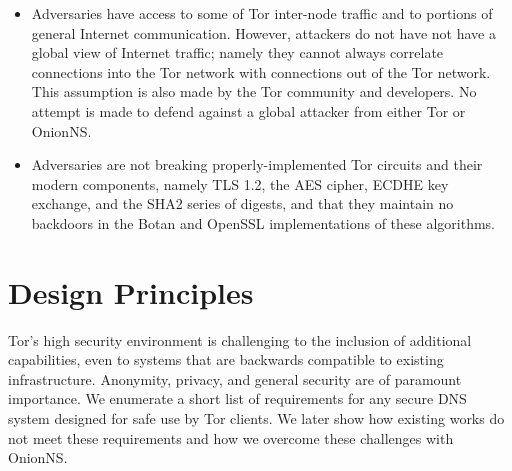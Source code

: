 \begin{itemize}
  \item Adversaries have access to some of Tor inter-node traffic and to portions of general Internet communication. However, attackers do not have not have a global view of Internet traffic; namely they cannot always correlate connections into the Tor network with connections out of the Tor network. This assumption is also made by the Tor community and developers. No attempt is made to defend against a global attacker from either Tor or OnionNS.
  \item Adversaries are not breaking properly-implemented Tor circuits and their modern components, namely TLS 1.2, the AES cipher, ECDHE key exchange, and the SHA2 series of digests, and that they maintain no backdoors in the Botan and OpenSSL implementations of these algorithms.
\end{itemize}

\section{Design Principles}

Tor's high security environment is challenging to the inclusion of additional capabilities, even to systems that are backwards compatible to existing infrastructure. Anonymity, privacy, and general security are of paramount importance. We enumerate a short list of requirements for any secure DNS system designed for safe use by Tor clients. We later show how existing works do not meet these requirements and how we overcome these challenges with OnionNS.

